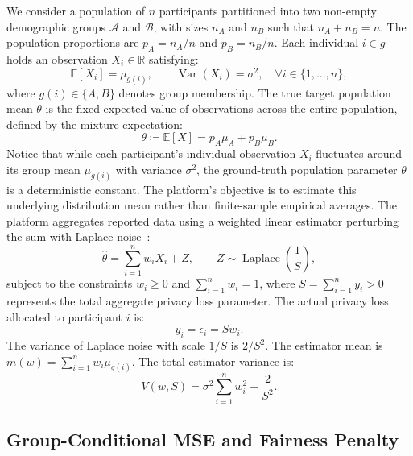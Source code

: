 \documentclass[11pt,a4paper]{article}
\newcommand{\R}{\mathbb{R}}
\newcommand{\E}{\mathbb{E}}
\newcommand{\Lap}{\operatorname{Laplace}}
\newcommand{\Var}{\operatorname{Var}}
\begin{document}
We consider a population of $n$ participants partitioned into two non-empty demographic groups $\mathcal{A}$ and $\mathcal{B}$, with sizes $n_A$ and $n_B$ such that $n_A + n_B = n$. The population proportions are $p_A = n_A/n$ and $p_B = n_B/n$. Each individual $i \in g$ holds an observation $X_i \in \R$ satisfying:
\begin{equation}
    \E[X_i] = \mu_{g(i)}, \qquad \Var(X_i) = \sigma^2, \quad \forall i \in \{1,\dots,n\},
\end{equation}
where $g(i) \in \{A, B\}$ denotes group membership. The true target population mean $\theta$ is the fixed expected value of observations across the entire population, defined by the mixture expectation:
\begin{equation}
    \theta \coloneqq \E[X] = p_A \mu_A + p_B \mu_B.
\end{equation}
Notice that while each participant's individual observation $X_i$ fluctuates around its group mean $\mu_{g(i)}$ with variance $\sigma^2$, the ground-truth population parameter $\theta$ is a deterministic constant. The platform's objective is to estimate this underlying distribution mean rather than finite-sample empirical averages.
The platform aggregates reported data using a weighted linear estimator perturbing the sum with Laplace noise~\cite{dwork2006calibrating,fallah2023optimal}:
\begin{equation}
    \widehat{\theta} = \sum_{i=1}^n w_i X_i + Z, \qquad Z \sim \Lap\left(\frac{1}{S}\right),
    \label{eq:estimator}
\end{equation}
subject to the constraints $w_i \geq 0$ and $\sum_{i=1}^n w_i = 1$, where $S = \sum_{i=1}^n y_i > 0$ represents the total aggregate privacy loss parameter. The actual privacy loss allocated to participant $i$ is:
\begin{equation}
    y_i = \epsilon_i = S w_i.
\end{equation}
The variance of Laplace noise with scale $1/S$ is $2/S^2$. The estimator mean is $m(w) = \sum_{i=1}^n w_i \mu_{g(i)}$. The total estimator variance is:
\begin{equation}
    V(w, S) = \sigma^2 \sum_{i=1}^n w_i^2 + \frac{2}{S^2}.
\end{equation}

\subsection{Group-Conditional MSE and Fairness Penalty}
\end{document}
